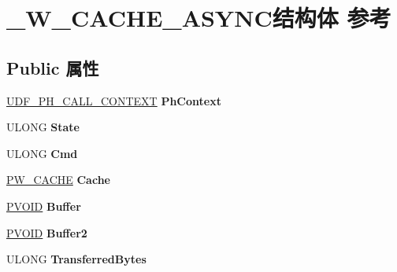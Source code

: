 \hypertarget{struct___w___c_a_c_h_e___a_s_y_n_c}{}\section{\+\_\+\+W\+\_\+\+C\+A\+C\+H\+E\+\_\+\+A\+S\+Y\+N\+C结构体 参考}
\label{struct___w___c_a_c_h_e___a_s_y_n_c}
\subsection*{Public 属性}
\begin{DoxyCompactItemize}
\item 
\mbox{\label{struct___w___c_a_c_h_e___a_s_y_n_c_ae86162a6ffd852dc91c19d2c9d24d951}} 
\hyperlink{struct___u_d_f___p_h___c_a_l_l___c_o_n_t_e_x_t}{U\+D\+F\+\_\+\+P\+H\+\_\+\+C\+A\+L\+L\+\_\+\+C\+O\+N\+T\+E\+XT} {\bfseries Ph\+Context}
\item 
\mbox{\label{struct___w___c_a_c_h_e___a_s_y_n_c_ad291eecd05cc5b1c445915e673059ba3}} 
U\+L\+O\+NG {\bfseries State}
\item 
\mbox{\label{struct___w___c_a_c_h_e___a_s_y_n_c_a349a6de3c859637aae60c86766a9c380}} 
U\+L\+O\+NG {\bfseries Cmd}
\item 
\mbox{\label{struct___w___c_a_c_h_e___a_s_y_n_c_ab7655e791b784ac799485a144dd05200}} 
\hyperlink{struct___w___c_a_c_h_e}{P\+W\+\_\+\+C\+A\+C\+HE} {\bfseries Cache}
\item 
\mbox{\label{struct___w___c_a_c_h_e___a_s_y_n_c_a23e8348d79bdd8fc5e4e17f56deb53d3}} 
\hyperlink{interfacevoid}{P\+V\+O\+ID} {\bfseries Buffer}
\item 
\mbox{\label{struct___w___c_a_c_h_e___a_s_y_n_c_ac9c12f8ae0ceaaec5414647a3236d280}} 
\hyperlink{interfacevoid}{P\+V\+O\+ID} {\bfseries Buffer2}
\item 
\mbox{\label{struct___w___c_a_c_h_e___a_s_y_n_c_a1961259db6078afb13d3f2ee69cd80e2}} 
U\+L\+O\+NG {\bfseries Transferred\+Bytes}

\end{DoxyCompactItemize}
